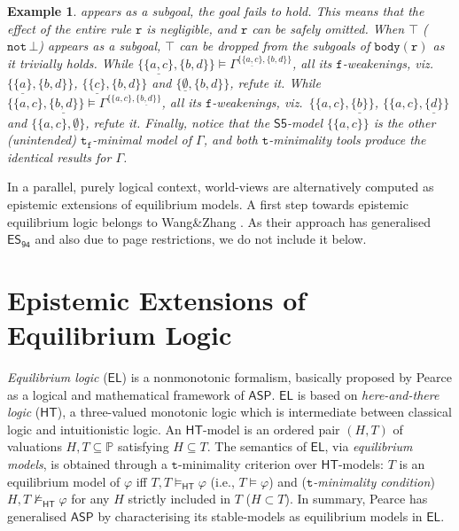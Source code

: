 \documentclass[submission,copyright,creativecommons]{eptcs}
\renewcommand{\phi}  { \varphi }
\newcommand{\Prop}  { \mathbb{P} }
\newcommand{\set}[1]  { \{ #1 \} }
\newcommand{\bigset}[1]  { \big\{ #1 \big\} }
\newcommand{\logic}[1]  { \ensuremath{\mathsf{#1}} }
\newcommand{\sfive}  { \logic{S5} }
\newcommand{\HT}  { \logic{HT} }
\newcommand{\ASP}  { \logic{ASP} }
\newcommand{\EL}  { \logic{EL} }
\newcommand{\lpnot}  { \mathtt{not} \, }
\newcommand{\ESdoksandort}  { \logic{ES_{\scriptscriptstyle{94}} } }
\newcommand{\functional}  { \texttt{f} }
\newcommand{\htmodels}  { \ensuremath{ \models_{\scriptscriptstyle{\HT}} } }
\newcommand{\nothtmodels}  { \ensuremath{ \not\models_{\scriptscriptstyle{\HT}} } }
\newtheorem{example}{Example}
\begin{document}
\begin{example}
appears as a subgoal, the goal fails to hold. This
means that the effect of the entire rule $\mathtt{r}$ is negligible, 
and $\mathtt{r}$ can be safely omitted. When
$\top$ ($\lpnot \bot$) appears as a subgoal, 
$\top$ can be dropped from the subgoals of $\mathtt{body(r)}$
as it trivially holds.
While
$\bigset{\underline{\set{ a,c}}, \set {b,d}} \models 
\Gamma^{\set{\underline{\set{ a,c}}, \set {b,d}}}$,
all its $\functional$-weakenings, viz.\
$\bigset{\underline{\set{ a}}, \set {b,d}}$,
$\bigset{\underline{\set{ c}}, \set {b,d}}$  and
$\bigset{\underline{\emptyset}, \set {b,d}}$, refute it. While
$\bigset{\set{a,c}, \underline{\set {b,d}}} \models
\Gamma^{\set{\set{a,c}, \underline{\set {b,d}}}}$, all its $\functional$-weakenings, viz.\
$\bigset{\set{ a,c }, \underline{\set {b}}}$,
$\bigset{\set{a,c}, \underline{\set {d}}}$ and
$\bigset{\set{a,c}, \underline{\emptyset}}$, refute it. Finally, notice that
the $\sfive$-model $\set{\set{a,c}}$
is the other (unintended) $\texttt{t}_{\!{\functional}}$-minimal model of $\Gamma$, and
both $\texttt{t}$-minimality tools
produce the identical results for $\Gamma$.
\end{example}

In a parallel, purely logical context, world-views are alternatively 
computed as epistemic extensions of equilibrium models. A first step towards
epistemic equilibrium logic belongs to Wang\&Zhang \cite{WangZ05nested}. 
As their approach has generalised $\ESdoksandort$ and also due to page restrictions, 
we do not include it below.

\section{Epistemic Extensions of Equilibrium Logic}
\label{sec:epistemic equilibrium logic}
\emph{Equilibrium logic} ($\EL$) is a nonmonotonic formalism, basically proposed by Pearce \cite{Pearce06} as a logical and mathematical framework of $\ASP$.
$\EL$ is based on \emph{here-and-there logic} ($\HT$), 
a three-valued monotonic logic which is intermediate between classical logic 
and intuitionistic logic. 
An $\HT$-model is an ordered pair $(H,T)$ of valuations 
$H,T \subseteq \Prop$ satisfying $H \subseteq T$.
The semantics of $\EL$, via \emph{equilibrium models}, is obtained through a
$\texttt{t}$-minimality criterion over $\HT$-models: $T$ is an equilibrium model of
$\phi$ iff $T,T \htmodels \phi$ (i.e., $T \models \phi$)
and (\emph{$\texttt{t}$-minimality condition})
$H,T \nothtmodels \phi$ for any $H$ strictly included in $T$
($H \subset T$). In summary,
Pearce has generalised $\ASP$ by characterising 
its stable-models as equilibrium models in $\EL$. 
\end{document}
